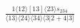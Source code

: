 \documentclass[varwidth, border=5pt]{standalone}
\begin{document}
\begin{my}
$\begin{gathered}
\scriptscriptstyle\frac{1⟨12⟩[13]⟨23⟩s_{234}}{⟨13⟩⟨24⟩⟨34⟩⟨3|2+4|3]}
\end{gathered}$
\end{my}
\end{document}
